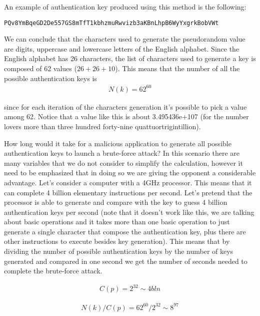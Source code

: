 An example of authentication key produced using this method is the following: 
\begin{lstlisting}
PQv8YmBqeGD2De557GS8mTfT1kbhzmuRwvizb3aKBnLhpB6WyYxgrkBobVWt
\end{lstlisting}

We can conclude that the characters used to generate the pseudorandom value are digits, uppercase and lowercase letters of the English alphabet. Since the English alphabet has 26 characters, the list of characters used to generate a key is composed of 62 values ($26 + 26 + 10$). This means that the number of all the possible authentication keys is 
\begin{align}
N(k) = 62^{60}
\end{align}

since for each iteration of the characters generation it's possible to pick a value among 62. Notice that a value like this is about 3.495436e+107 (for the number lovers more than three hundred forty-nine quattuortrigintillion). 

How long would it take for a malicious application to generate all possible authentication keys to launch a brute-force attack? In this scenario there are many variables that we do not consider to simplify the calculation, however it need to be emphasized that in doing so we are giving the opponent a considerable advantage. Let's consider a computer with a 4GHz processor. This means that it can complete 4 billion elementary instructions per second. Let's pretend that the processor is able to generate and compare with the key to guess 4 billion authentication keys per second (note that it doesn't work like this, we are talking about basic operations and it takes more than one basic operation to just generate a single character that compose the authentication key, plus there are other instructions to execute besides key generation). This means that by dividing the number of possible authentication keys by the number of keys generated and compared in one second we get the number of seconds needed to complete the brute-force attack.

\begin{align}
C(p) = 2^{32} \sim 4 bln
\end{align}

\begin{align}
N(k)/C(p) = 62^{60} / 2^{32} \sim 8^{97}
\end{align}

